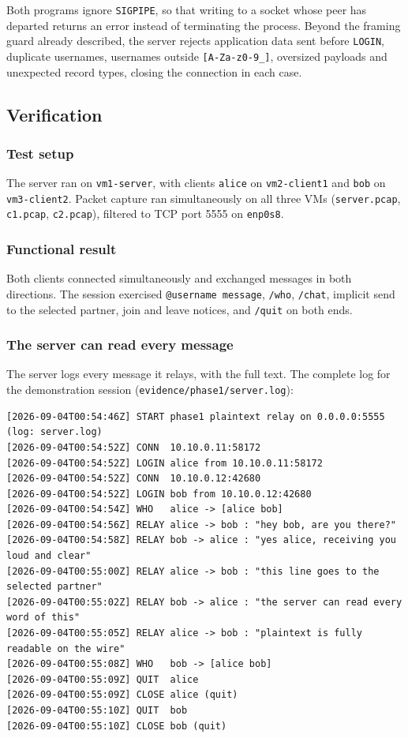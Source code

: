 \documentclass[11pt,a4paper]{article}
\begin{document}
Both programs ignore \texttt{SIGPIPE}, so that writing to a socket whose peer has departed returns
an error instead of terminating the process. Beyond the framing guard already described, the server
rejects application data sent before \texttt{LOGIN}, duplicate usernames, usernames outside
\texttt{[A-Za-z0-9\_]}, oversized payloads and unexpected record types, closing the connection in
each case.

\subsection{Verification}

\subsubsection{Test setup}

The server ran on \texttt{vm1-server}, with clients \texttt{alice} on \texttt{vm2-client1} and
\texttt{bob} on \texttt{vm3-client2}. Packet capture ran simultaneously on all three VMs
(\texttt{server.pcap}, \texttt{c1.pcap}, \texttt{c2.pcap}), filtered to TCP port 5555 on
\texttt{enp0s8}.

\subsubsection{Functional result}

Both clients connected simultaneously and exchanged messages in both directions. The session
exercised \texttt{@username message}, \texttt{/who}, \texttt{/chat}, implicit send to the selected
partner, join and leave notices, and \texttt{/quit} on both ends.

\subsubsection{The server can read every message}

The server logs every message it relays, with the full text. The complete log for the demonstration
session (\texttt{evidence/phase1/server.log}):

\begin{lstlisting}
[2026-09-04T00:54:46Z] START phase1 plaintext relay on 0.0.0.0:5555 (log: server.log)
[2026-09-04T00:54:52Z] CONN  10.10.0.11:58172
[2026-09-04T00:54:52Z] LOGIN alice from 10.10.0.11:58172
[2026-09-04T00:54:52Z] CONN  10.10.0.12:42680
[2026-09-04T00:54:52Z] LOGIN bob from 10.10.0.12:42680
[2026-09-04T00:54:54Z] WHO   alice -> [alice bob]
[2026-09-04T00:54:56Z] RELAY alice -> bob : "hey bob, are you there?"
[2026-09-04T00:54:58Z] RELAY bob -> alice : "yes alice, receiving you loud and clear"
[2026-09-04T00:55:00Z] RELAY alice -> bob : "this line goes to the selected partner"
[2026-09-04T00:55:02Z] RELAY bob -> alice : "the server can read every word of this"
[2026-09-04T00:55:05Z] RELAY alice -> bob : "plaintext is fully readable on the wire"
[2026-09-04T00:55:08Z] WHO   bob -> [alice bob]
[2026-09-04T00:55:09Z] QUIT  alice
[2026-09-04T00:55:09Z] CLOSE alice (quit)
[2026-09-04T00:55:10Z] QUIT  bob
[2026-09-04T00:55:10Z] CLOSE bob (quit)
\end{lstlisting}
\end{document}
